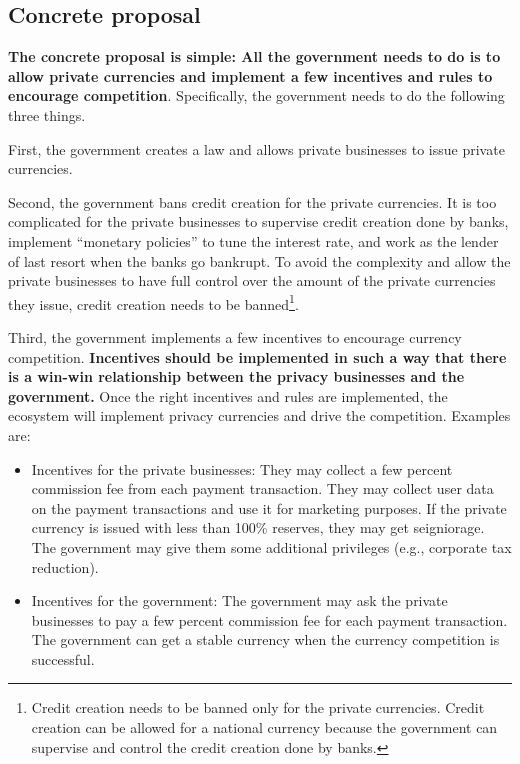 \documentclass[dvipdfmx,a4paper]{article}
\begin{document}
\subsection{Concrete proposal}

\textbf{The concrete proposal is simple: All the government needs to do is to allow private currencies and implement a few incentives and rules to encourage competition}. Specifically, the government needs to do the following three things.

First, the government creates a law and allows private businesses to issue private currencies.

Second, the government bans credit creation for the private currencies. It is too complicated for the private businesses to supervise credit creation done by banks, implement ``monetary policies'' to tune the interest rate, and work as the lender of last resort when the banks go bankrupt. To avoid the complexity and allow the private businesses to have full control over the amount of the private currencies they issue, credit creation needs to be banned\footnote{Credit creation needs to be banned only for the private currencies. Credit creation can be allowed for a national currency because the government can supervise and control the credit creation done by banks.}.

Third, the government implements a few incentives to encourage currency competition. \textbf{Incentives should be implemented in such a way that there is a win-win relationship between the privacy businesses and the government.} Once the right incentives and rules are implemented, the ecosystem will implement privacy currencies and drive the competition. Examples are:

\begin{itemize}
\item Incentives for the private businesses: They may collect a few percent commission fee from each payment transaction. They may collect user data on the payment transactions and use it for marketing purposes. If the private currency is issued with less than 100\% reserves, they may get seigniorage. The government may give them some additional privileges (e.g., corporate tax reduction).
\item Incentives for the government: The government may ask the private businesses to pay a few percent commission fee for each payment transaction. The government can get a stable currency when the currency competition is successful.
\end{itemize}
\end{document}
